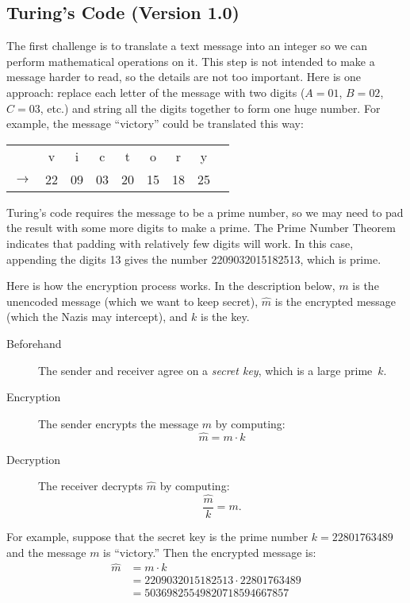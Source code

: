 \subsection{Turing's Code (Version 1.0)}\label{probable_primes}

The first challenge is to translate a text message into an integer so
we can perform mathematical operations on it.  This step is not
intended to make a message harder to read, so the details are not too
important.  Here is one approach: replace each letter of the message
with two digits ($A = 01$, $B = 02$, $C = 03$, etc.) and string all
the digits together to form one huge number.  For example, the message
``victory'' could be translated this way:
\begin{center}
\begin{tabular}{ccccccccc}
   &v & i & c & t & o & r & y \\
$\rightarrow$ & 22 & 09 & 03 & 20 &
  15 & 18 & 25
\end{tabular}
\end{center}
Turing's code requires the message to be a prime number, so we
may need to pad the result with some more digits to make a prime.  The
Prime Number Theorem indicates that padding with relatively few digits
will work.  In this case, appending the digits 13 gives the number
2209032015182513, which is prime.

Here is how the encryption process works.  In the description below,
$m$ is the unencoded message (which we want to keep secret), $\widehat{m}$ is
the encrypted message (which the Nazis may intercept), and $k$ is the
key.

\begin{description}

\item[Beforehand] The sender and receiver agree on a \emph{secret
  key}, which is a large prime~$k$.

\item[Encryption] The sender encrypts the message $m$ by computing:
\[
\widehat{m} = m \cdot k
\]

\item[Decryption] The receiver decrypts $\widehat{m}$ by computing:
\[
\frac{\widehat{m}}{k} = m.
\]

\iffalse = \frac{m \cdot k}{k} \fi

\end{description}

For example, suppose that the secret key is the prime number $k =
22801763489$ and the message $m$ is ``victory.''  Then the encrypted
message is:
\begin{align*}
\widehat{m} & = m \cdot k \\
& = 2209032015182513 \cdot 22801763489 \\
& =
50369825549820718594667857
\end{align*}

